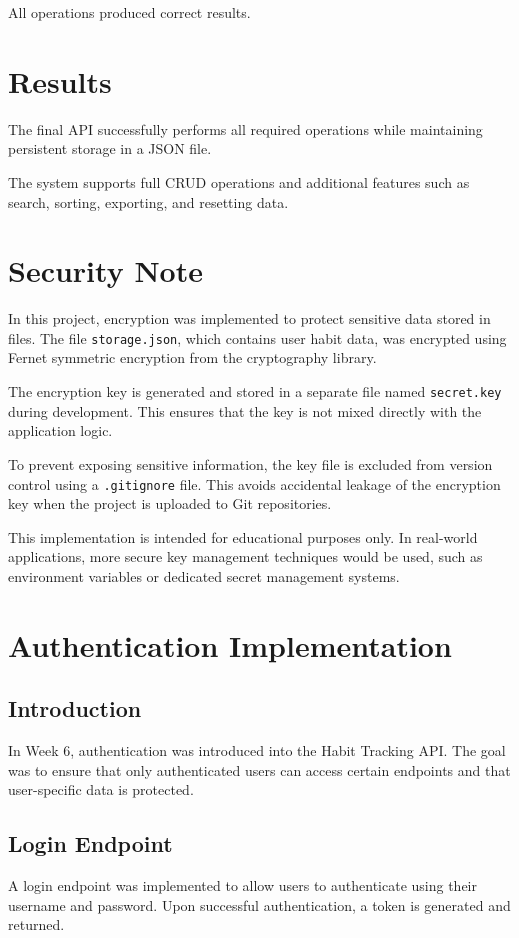 \documentclass[12pt]{article}
\begin{document}
All operations produced correct results.

\section{Results}

The final API successfully performs all required operations while maintaining 
persistent storage in a JSON file.

The system supports full CRUD operations and additional features such as search, 
sorting, exporting, and resetting data.

\section{Security Note}

In this project, encryption was implemented to protect sensitive data stored in files. 
The file \texttt{storage.json}, which contains user habit data, was encrypted using 
Fernet symmetric encryption from the cryptography library.

The encryption key is generated and stored in a separate file named 
\texttt{secret.key} during development. This ensures that the key is not mixed 
directly with the application logic.

To prevent exposing sensitive information, the key file is excluded from version 
control using a \texttt{.gitignore} file. This avoids accidental leakage of the 
encryption key when the project is uploaded to Git repositories.

This implementation is intended for educational purposes only. In real-world 
applications, more secure key management techniques would be used, such as 
environment variables or dedicated secret management systems.


\section{Authentication Implementation}

\subsection{Introduction}
In Week 6, authentication was introduced into the Habit Tracking API. The goal was to ensure that only authenticated users can access certain endpoints and that user-specific data is protected.

\subsection{Login Endpoint}
A login endpoint was implemented to allow users to authenticate using their username and password. Upon successful authentication, a token is generated and returned.
\end{document}
